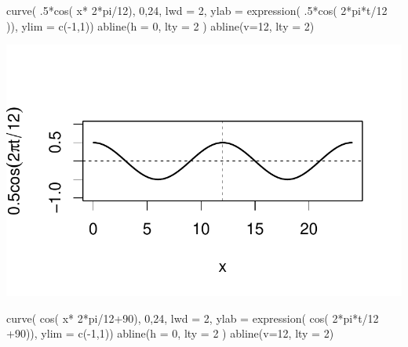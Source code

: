 \documentclass[
  letterpaper,
  DIV=11,
  numbers=noendperiod]{scrreprt}
\newenvironment{Shaded}{\begin{snugshade}}{\end{snugshade}}
\newcommand{\AttributeTok}[1]{\textcolor[rgb]{0.40,0.45,0.13}{#1}}
\newcommand{\DecValTok}[1]{\textcolor[rgb]{0.68,0.00,0.00}{#1}}
\newcommand{\FunctionTok}[1]{\textcolor[rgb]{0.28,0.35,0.67}{#1}}
\newcommand{\NormalTok}[1]{\textcolor[rgb]{0.00,0.23,0.31}{#1}}
\newcommand{\SpecialCharTok}[1]{\textcolor[rgb]{0.37,0.37,0.37}{#1}}
\begin{document}
\begin{Shaded}
\begin{Highlighting}[]
\FunctionTok{curve}\NormalTok{( .}\DecValTok{5}\SpecialCharTok{*}\FunctionTok{cos}\NormalTok{( x}\SpecialCharTok{*} \DecValTok{2}\SpecialCharTok{*}\NormalTok{pi}\SpecialCharTok{/}\DecValTok{12}\NormalTok{), }\DecValTok{0}\NormalTok{,}\DecValTok{24}\NormalTok{, }\AttributeTok{lwd =} \DecValTok{2}\NormalTok{, }\AttributeTok{ylab =} \FunctionTok{expression}\NormalTok{( .}\DecValTok{5}\SpecialCharTok{*}\FunctionTok{cos}\NormalTok{( }\DecValTok{2}\SpecialCharTok{*}\NormalTok{pi}\SpecialCharTok{*}\NormalTok{t}\SpecialCharTok{/}\DecValTok{12}\NormalTok{ )), }\AttributeTok{ylim =} \FunctionTok{c}\NormalTok{(}\SpecialCharTok{{-}}\DecValTok{1}\NormalTok{,}\DecValTok{1}\NormalTok{))}
\FunctionTok{abline}\NormalTok{(}\AttributeTok{h =} \DecValTok{0}\NormalTok{, }\AttributeTok{lty =} \DecValTok{2}\NormalTok{ )}
\FunctionTok{abline}\NormalTok{(}\AttributeTok{v=}\DecValTok{12}\NormalTok{, }\AttributeTok{lty =} \DecValTok{2}\NormalTok{)}
\end{Highlighting}
\end{Shaded}

\includegraphics{sinal_files/figure-pdf/unnamed-chunk-8-2.pdf}

\begin{Shaded}
\begin{Highlighting}[]
\FunctionTok{curve}\NormalTok{( }\FunctionTok{cos}\NormalTok{( x}\SpecialCharTok{*} \DecValTok{2}\SpecialCharTok{*}\NormalTok{pi}\SpecialCharTok{/}\DecValTok{12}\SpecialCharTok{+}\DecValTok{90}\NormalTok{), }\DecValTok{0}\NormalTok{,}\DecValTok{24}\NormalTok{, }\AttributeTok{lwd =} \DecValTok{2}\NormalTok{, }\AttributeTok{ylab =} \FunctionTok{expression}\NormalTok{( }\FunctionTok{cos}\NormalTok{( }\DecValTok{2}\SpecialCharTok{*}\NormalTok{pi}\SpecialCharTok{*}\NormalTok{t}\SpecialCharTok{/}\DecValTok{12} \SpecialCharTok{+}\DecValTok{90}\NormalTok{)), }\AttributeTok{ylim =} \FunctionTok{c}\NormalTok{(}\SpecialCharTok{{-}}\DecValTok{1}\NormalTok{,}\DecValTok{1}\NormalTok{))}
\FunctionTok{abline}\NormalTok{(}\AttributeTok{h =} \DecValTok{0}\NormalTok{, }\AttributeTok{lty =} \DecValTok{2}\NormalTok{ )}
\FunctionTok{abline}\NormalTok{(}\AttributeTok{v=}\DecValTok{12}\NormalTok{, }\AttributeTok{lty =} \DecValTok{2}\NormalTok{)}
\end{Highlighting}
\end{Shaded}
\end{document}
